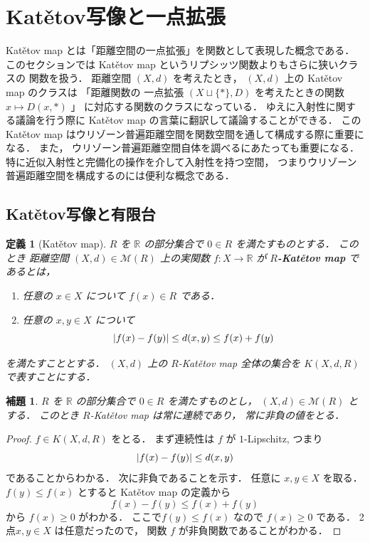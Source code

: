 \documentclass[leqno, 12pt]{jsarticle}
\newtheorem{lem}[thm]{補題}
\newtheorem{df}[thm]{定義}
\newcommand{\rr}{\mathbb{R}}
\DeclarePairedDelimiter{\abs}{\lvert}{\rvert}
\newcommand{\Met}[1]{\mathscr{M}(#1)}
\newcommand{\KatSpace}[3]{K(#1,#2,#3)}
\begin{document}
\section{\texorpdfstring{Kat\v{e}tov}{Katetov}写像と一点拡張}\label{sec:katetov}
Kat\v{e}tov map
とは「距離空間の一点拡張」を関数として表現した概念である．
このセクションでは
Kat\v{e}tov map
というリプシッツ関数よりもさらに狭いクラスの
関数を扱う．
距離空間
$(X, d)$
を考えたとき，
$(X, d)$
上の
Kat\v{e}tov map
のクラスは
「距離関数の
一点拡張
$(X\sqcup\{*\}, D)$
を考えたときの関数
$x\mapsto D(x, *)$%
」
に対応する関数のクラスになっている．
ゆえに入射性に関する議論を行う際に
Kat\v{e}tov map
の言葉に翻訳して議論することができる．
この
Kat\v{e}tov map
はウリゾーン普遍距離空間を関数空間を通して構成する際に重要になる．
また，%
ウリゾーン普遍距離空間自体を調べるにあたっても重要になる．
特に近似入射性と完備化の操作を介して入射性を持つ空間，
つまりウリゾーン普遍距離空間を構成するのには便利な概念である．





\subsection{\texorpdfstring{Kat\v{e}tov}{Katetov}写像と有限台}\label{subsec:katetov:finite-support}
\begin{df}[Kat\v{e}tov map]\label{df:katetov:katetovmap}
$R$
を
$\rr$
の部分集合で
$0\in R$
を満たすものとする．
このとき
距離空間
$(X,d)\in \Met{R}$
上の実関数
$f\colon X\to \rr$
が
\textbf{%
$R$-Kat\v{e}tov map}
であるとは，
\begin{enumerate}[label=\textup{(\arabic*)}]
\item
任意の
$x\in X$
について
$f(x)\in R$
である．
\item
任意の
$x, y\in X$
について
\[
\abs{f(x)-f(y)}\le d(x,y)\le f(x)+f(y)
\]
\end{enumerate}
を満たすこととする．
$(X, d)$
上の
$R$-Kat\v{e}tov map
全体の集合を
$\KatSpace{X}{d}{R}$
で表すことにする．
\end{df}

\begin{lem}\label{lem:katetov:katproperty}
$R$
を
$\rr$
の部分集合で
$0\in R$
を満たすものとし，
$(X,d)\in\Met{R}$
とする．
このとき
$R$-Kat\v{e}tov map
は常に連続であり，
常に非負の値をとる．
\end{lem}
\begin{proof}
$f\in \KatSpace{X}{d}{R}$
をとる．
まず連続性は
$f$
が
$1$-Lipschitz,
つまり
\[
\abs{f(x)-f(y)}\le d(x, y)
\]
であることからわかる．
次に非負であることを示す．
任意に
$x, y\in X$
を取る．
$f(y)\le f(x)$
とすると
Kat\v{e}tov map
の定義から
\[
f(x)-f(y)\le f(x)+f(y)
\]
から
$f(x)\ge 0$
がわかる．
ここで$f(y)\le f(x)$
なので
$f(x)\ge 0$
である．
2点$x, y\in X$
は任意だったので，
関数
$f$
が非負関数であることがわかる．
\end{proof}
\end{document}

